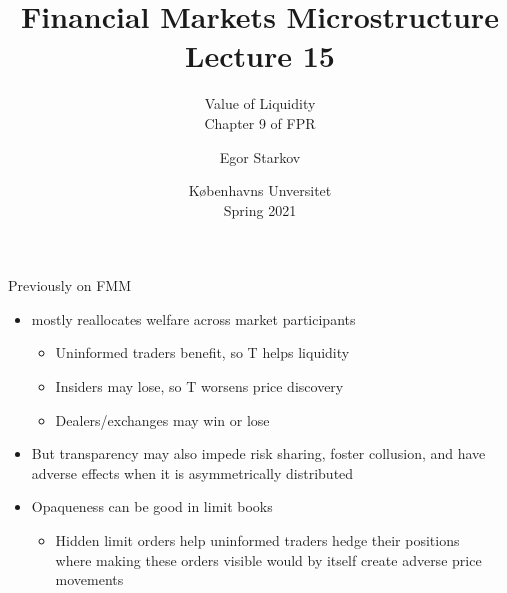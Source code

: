 \documentclass[english,10pt
,aspectratio=169
]{beamer}
\title{Financial Markets Microstructure \\ Lecture 15}
\subtitle{Value of Liquidity\\
	Chapter 9 of FPR}
\author{Egor Starkov}
\date{K{\o}benhavns Unversitet \\
	Spring 2021}
\begin{document}
\frame[plain]{\titlepage}


\begin{frame}{Previously on FMM}
	\begin{itemize}
		\item {} mostly reallocates welfare across market participants 
		\begin{itemize}
			\item Uninformed traders benefit, so T {helps liquidity}
			\item Insiders may lose, so T {worsens price discovery}
			\item Dealers/exchanges may win or lose
		\end{itemize}
		\item But transparency may also impede risk sharing, foster collusion, and have adverse effects when it is asymmetrically distributed
		\item Opaqueness can be good in limit books
		\begin{itemize}
			\item Hidden limit orders help uninformed traders hedge their positions 
			\\where making these orders visible would by itself create adverse price movements
		\end{itemize}
	\end{itemize}
\end{frame}
\end{document}
